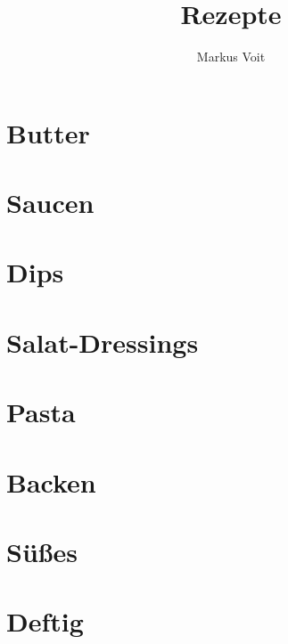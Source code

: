 \documentclass[
  DIV=11,%
  pagesize,%
  fontsize=11pt,%
  paper=a4,%
  numbers=noenddot,
]{scrartcl}
\title{Rezepte}
\author{Markus Voit}
\begin{document}
\maketitle
\clearpage
\tableofcontents
\clearpage

\section{Butter}
\newpage
\newpage
\newpage
\newpage
\newpage

\section{Saucen}
\newpage
\newpage
\newpage
\newpage

\section{Dips}
\newpage

\section{Salat-Dressings}
\newpage

\section{Pasta}
\newpage
\newpage

\section{Backen}
\newpage

\section{Süßes}
\newpage

\section{Deftig}
\newpage
\end{document}
